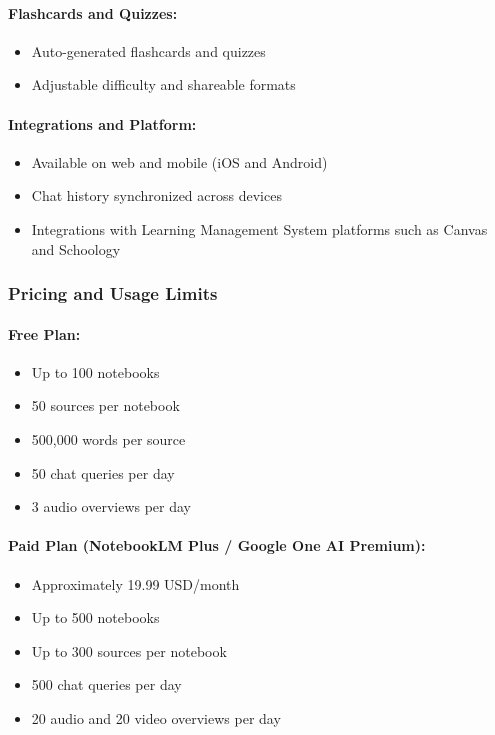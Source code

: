 \documentclass[12pt, a4paper, oneside]{report}
\begin{document}
\newpage

\paragraph{Flashcards and Quizzes:}
\begin{itemize}[noitemsep]
  \item Auto-generated flashcards and quizzes
  \item Adjustable difficulty and shareable formats
\end{itemize}

\paragraph{Integrations and Platform:}
\begin{itemize}[noitemsep]
  \item Available on web and mobile (iOS and Android)
  \item Chat history synchronized across devices
  \item Integrations with Learning Management System platforms such as Canvas and Schoology
\end{itemize}

\subsubsection{Pricing and Usage Limits}

\paragraph{Free Plan:}
\begin{itemize}[noitemsep]
  \item Up to 100 notebooks
  \item 50 sources per notebook
  \item 500,000 words per source
  \item 50 chat queries per day
  \item 3 audio overviews per day
\end{itemize}

\paragraph{Paid Plan (NotebookLM Plus / Google One AI Premium):}
\begin{itemize}[noitemsep]
  \item Approximately 19.99 USD/month
  \item Up to 500 notebooks
  \item Up to 300 sources per notebook
  \item 500 chat queries per day
  \item 20 audio and 20 video overviews per day
\end{itemize}
\end{document}
